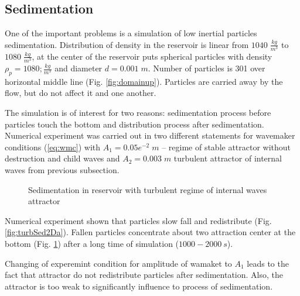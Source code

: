 \documentclass[a4wide,fontsize=12pt]{article}
\begin{document}
\subsection{Sedimentation}

One of the important problems is a simulation of low inertial particles sedimentation. Distribution of density in  the reservoir is linear from $1040\;\frac{kg}{m^3}$ to $1080\;\frac{kg}{m^3}$, at the center of the reservoir puts spherical particles with density $\rho_p = 1080;\frac{kg}{m^3}$ and diameter $d=0.001 \; m$.  Number of particles is 301 over horizontal middle line (Fig. \ref{fig:domainup}). Particles are carried away by the flow, but do not affect it and one another.

The simulation is of interest for two reasons: sedimentation process before particles touch the bottom and distribution process after sedimentation. Numerical experiment was carried out in two different statements for wavemaker conditions (\ref{eq:wmc}) with $A_1=0.05e^{-2}\;m$ -- regime of stable attractor without destruction and child waves and $A_2=0.003\;m$ turbulent attractor of internal waves from previous subsection. 

\begin{figure}
\centering
    \begin{minipage}[t]{0.45\textwidth}
        \centering
        \label{fig:turbSed2Da}
    \end{minipage}
    \begin{minipage}[t]{0.45\textwidth}
        \centering
        \label{fig:turbSed2Db}
    \end{minipage}
    \caption{Sedimentation in reservoir with turbulent regime of internal waves attractor}
\end{figure}

Numerical experiment shown that particles slow fall and redistribute (Fig. \ref{fig:turbSed2Da}). Fallen particles concentrate about two attraction center at the bottom (Fig. \ref{fig:turbSed2Db}) after a long time of simulation ($1000-2000\ s$).

Changing of experemint condition for amplitude of wamaket to $A_1$ leads to the fact that attractor do not redistribute particles after sedimentation. Also, the attractor is too weak to significantly influence to process of sedimentation.
\end{document}
